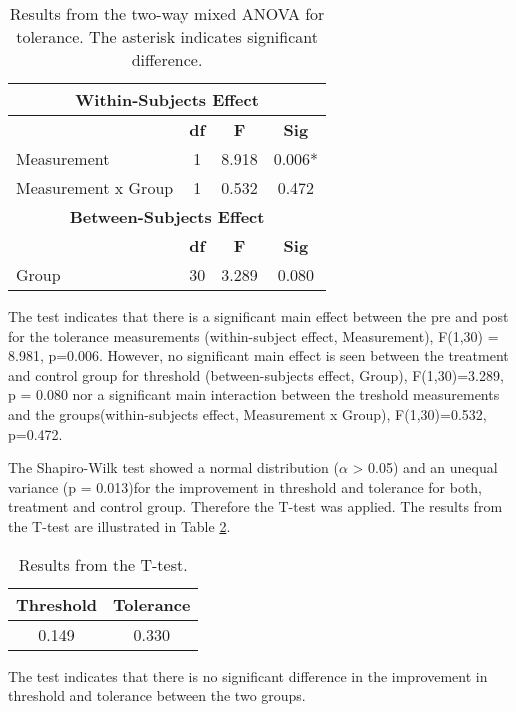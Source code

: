 \begin{table}[ht]
\caption{Results from the two-way mixed ANOVA for tolerance. The asterisk indicates significant difference.}
\centering
\begin{tabular}{l c c c}
\toprule
\multicolumn{4}{c}{\textbf{Within-Subjects Effect}} \\
\midrule  
& \textbf{df} & \textbf{F} & \textbf{Sig} \\ [0.5ex] %
Measurement & 1 &  8.918 &  0.006* \\
Measurement x Group & 1 & 0.532 & 0.472 \\
\toprule
\multicolumn{4}{c}{\textbf{Between-Subjects Effect}} \\
\midrule
 & \textbf{df} & \textbf{F} & \textbf{Sig} \\ [0.5ex] %
Group & 30 & 3.289 &  0.080 \\
\hline
\end{tabular}
\label{table:TWOWAYANOVA2}
\end{table}

\noindent
The test indicates that there is a significant main effect between the pre and post for the tolerance measurements (within-subject effect, Measurement), F(1,30) = 8.981, p=0.006. However, no significant main effect is seen between the treatment and control group for threshold (between-subjects effect, Group), F(1,30)=3.289, p = 0.080 nor a significant main interaction between the treshold measurements and the groups(within-subjects effect, Measurement x Group), F(1,30)=0.532, p=0.472. 

The Shapiro-Wilk test showed a normal distribution ($\alpha$ > 0.05) and an unequal variance (p = 0.013)for the improvement in threshold and tolerance for both, treatment and control group. Therefore the T-test was applied. The results from the T-test are illustrated in Table \ref{table:TTEST}. 

\begin{table}[ht]
\caption{Results from the T-test.}
\centering
\begin{tabular}{c c}
\toprule
\textbf{Threshold} & \textbf{Tolerance} \\
\midrule
 0.149 &  0.330 \\
\hline
\end{tabular}
\label{table:TTEST}
\end{table}

\noindent
The test indicates that there is no significant difference in the improvement in threshold and tolerance between the two groups.